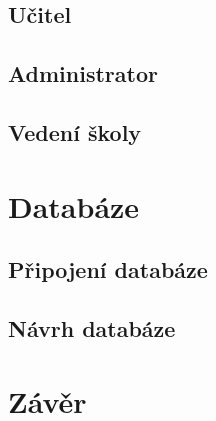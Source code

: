 \documentclass[a4paper, 12pt]{report}
\begin{document}
	\section{Učitel}
	\section{Administrator}
	\section{Vedení školy}

	\chapter{Databáze} \label{Databaze}
	\section{Připojení databáze}
	\section{Návrh databáze}
	\chapter{Závěr}

	\seznamTabulek
	
	\seznamObrazku

	\renewcommand\listoflistingscaption{Seznam zdrojových kódů}
	\listoflistings
	

	
	

\end{document}
